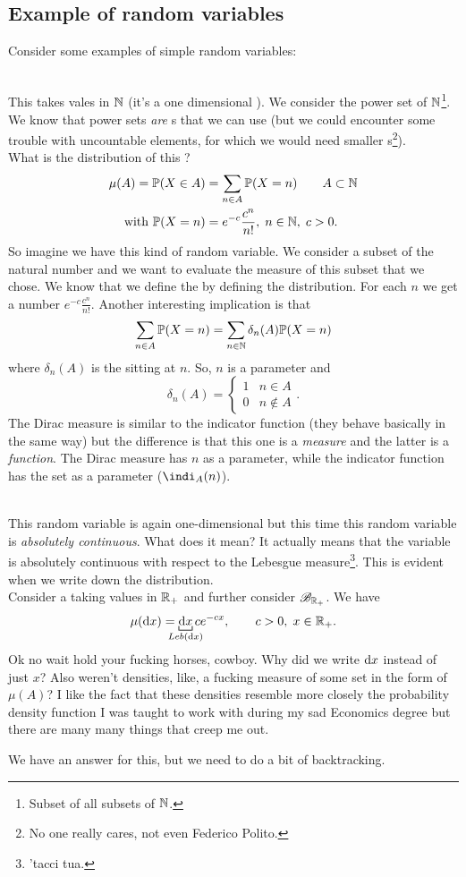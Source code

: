 \documentclass{report}
\begin{document}
\subsection{Example of random variables}
Consider some examples of simple random variables:
\begin{example}
	\\
	This \rv{} takes vales in $\mathbb{N}$ (it's a one dimensional \rv{}). We consider the power set of $\mathbb{N}$\footnote{Subset of all subsets of $\mathbb{N}$.}. We know that power sets \textit{are} \sa s that we can use (but we could encounter some trouble with uncountable elements, for which we would need smaller \sa s\footnote{No one really cares, not even Federico Polito.}).\\
	What is the distribution of this \rv{}?
	\begin{align*}
	\mu(A)=\mathbb{P}(X\in A)&=\sum_{n\in A}\mathbb{P}(X=n)\qquad A\subset\mathbb{N}\\
	\text{with } \mathbb{P}(X=n)&=e^{-c}\frac{c^n}{n!}, \;n\in\mathbb{N},\;c>0.
	\end{align*}
	So imagine we have this kind of random variable. We consider a subset of the natural number and we want to evaluate the measure of this subset that we chose. We know that we define the \rv{} by defining the distribution. For each $n$ we get a number $e^{-c}\frac{c^n}{n!}$. Another interesting implication is that \[\sum_{n\in A}\mathbb{P}(X=n)=\sum_{n\in\mathbb{N}}\delta_n(A)\mathbb{P}(X=n)\] where $\delta_n(A)$ is the  sitting at $n$. So, $n$ is a parameter and 
	\[\delta_n(A)=\begin{cases}
		1 &n\in A\\
		0 &n\not\in A
	\end{cases}.\] The Dirac measure is similar to the indicator function (they behave basically in the same way) but the difference is that this one is a \textit{measure} and the latter is a \textit{function}. The Dirac measure has $n$ as a parameter, while the indicator function has the set as a parameter ($\indi_A(n)$).
\end{example}
\begin{example}
	\\
	This random variable is again one-dimensional but this time this random variable is \textit{absolutely continuous}. What does it mean? It actually means that the variable is absolutely continuous with respect to the Lebesgue measure\footnote{'tacci tua.}. This is evident when we write down the distribution.\\
	Consider a \rv{} taking values in $\mathbb{R}_+$ and further consider $\mathscr{B}_{\mathbb{R}_+}$. We have
	\[\mu(\dif x)=\underbracket[0.6pt]{\dif x}_{\mathclap{Leb(\dif x)}}ce^{-cx},\qquad c>0,\;x\in\R_+.\]
	Ok no wait hold your fucking horses, cowboy. Why did we write $\mathop{}\!\mathrm{d} x$ instead of just $x$? Also weren't densities, like, a fucking measure of some set in the form of $\mu(A)$? I like the fact that these densities resemble more closely the probability density function I was taught to work with during my sad Economics degree but there are many many things that creep me out. \par
	We have an answer for this, but we need to do a bit of backtracking.
\end{example}
\end{document}
